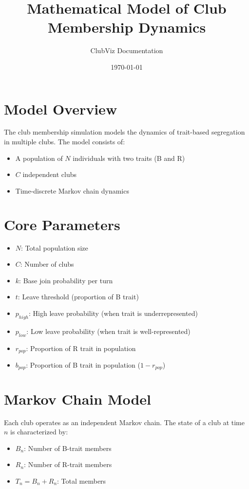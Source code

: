 \documentclass{article}
\title{Mathematical Model of Club Membership Dynamics}
\author{ClubViz Documentation}
\date{\today}
\begin{document}
\maketitle

\section{Model Overview}
The club membership simulation models the dynamics of trait-based segregation in multiple clubs. The model consists of:
\begin{itemize}
    \item A population of $N$ individuals with two traits (B and R)
    \item $C$ independent clubs
    \item Time-discrete Markov chain dynamics
\end{itemize}

\section{Core Parameters}
\begin{itemize}
    \item $N$: Total population size
    \item $C$: Number of clubs
    \item $k$: Base join probability per turn
    \item $t$: Leave threshold (proportion of B trait)
    \item $p_{high}$: High leave probability (when trait is underrepresented)
    \item $p_{low}$: Low leave probability (when trait is well-represented)
    \item $r_{pop}$: Proportion of R trait in population
    \item $b_{pop}$: Proportion of B trait in population ($1 - r_{pop}$)
\end{itemize}

\section{Markov Chain Model}
Each club operates as an independent Markov chain. The state of a club at time $n$ is characterized by:
\begin{itemize}
    \item $B_n$: Number of B-trait members
    \item $R_n$: Number of R-trait members
    \item $T_n = B_n + R_n$: Total members
\end{itemize}
\end{document}
